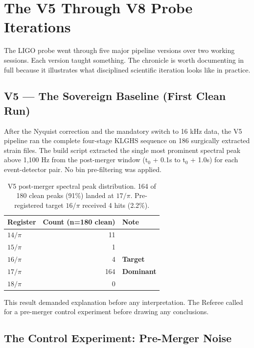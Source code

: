 \documentclass[11pt, letterpaper, openany]{book}
\begin{document}
\section*{The V5 Through V8 Probe Iterations}

The LIGO probe went through five major pipeline versions over two
working sessions. Each version taught something. The chronicle is
worth documenting in full because it illustrates what disciplined
scientific iteration looks like in practice.

\subsection*{V5 — The Sovereign Baseline (First Clean Run)}

After the Nyquist correction and the mandatory switch to 16 kHz data,
the V5 pipeline ran the complete four-stage KLGHS sequence on 186
surgically extracted strain files. The build script extracted the
single most prominent spectral peak above 1,100 Hz from the post-merger
window (t$_0$ + 0.1s to t$_0$ + 1.0s) for each event-detector pair.
No bin pre-filtering was applied.

\begin{table}[H]
\centering
\renewcommand{\arraystretch}{1.4}
\small
\begin{tabular}{|l|r|l|}
\hline
\rowcolor{kishblue!10}
\textbf{Register} & \textbf{Count (n=180 clean)} & \textbf{Note} \\
\hline\hline
$14/\pi$ & 11 & \\
$15/\pi$ & 1  & \\
$16/\pi$ & 4  & \textbf{Target} \\
$17/\pi$ & 164 & \textbf{Dominant} \\
$18/\pi$ & 0  & \\
\hline
\end{tabular}
\caption{V5 post-merger spectral peak distribution. 164 of 180 clean
peaks (91\%) landed at $17/\pi$. Pre-registered target $16/\pi$ received
4 hits (2.2\%).}
\end{table}

This result demanded explanation before any interpretation. The Referee
called for a pre-merger control experiment before drawing any conclusions.

\subsection*{The Control Experiment: Pre-Merger Noise}
\end{document}
